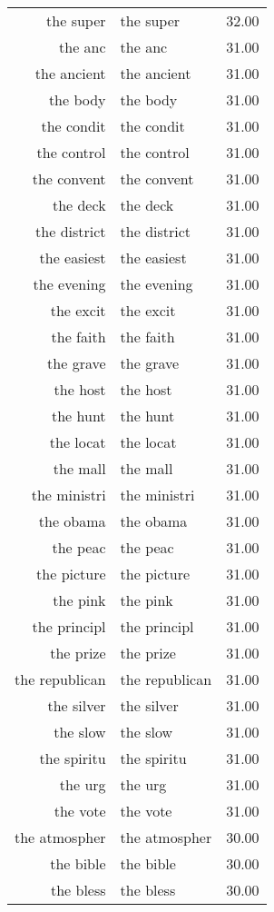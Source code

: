 \begin{table}[ht]
\begin{tabular}{rlr}
  the super & the super & 32.00 \\ 
  the anc & the anc & 31.00 \\ 
  the ancient & the ancient & 31.00 \\ 
  the body & the body & 31.00 \\ 
  the condit & the condit & 31.00 \\ 
  the control & the control & 31.00 \\ 
  the convent & the convent & 31.00 \\ 
  the deck & the deck & 31.00 \\ 
  the district & the district & 31.00 \\ 
  the easiest & the easiest & 31.00 \\ 
  the evening & the evening & 31.00 \\ 
  the excit & the excit & 31.00 \\ 
  the faith & the faith & 31.00 \\ 
  the grave & the grave & 31.00 \\ 
  the host & the host & 31.00 \\ 
  the hunt & the hunt & 31.00 \\ 
  the locat & the locat & 31.00 \\ 
  the mall & the mall & 31.00 \\ 
  the ministri & the ministri & 31.00 \\ 
  the obama & the obama & 31.00 \\ 
  the peac & the peac & 31.00 \\ 
  the picture & the picture & 31.00 \\ 
  the pink & the pink & 31.00 \\ 
  the principl & the principl & 31.00 \\ 
  the prize & the prize & 31.00 \\ 
  the republican & the republican & 31.00 \\ 
  the silver & the silver & 31.00 \\ 
  the slow & the slow & 31.00 \\ 
  the spiritu & the spiritu & 31.00 \\ 
  the urg & the urg & 31.00 \\ 
  the vote & the vote & 31.00 \\ 
  the atmospher & the atmospher & 30.00 \\ 
  the bible & the bible & 30.00 \\ 
  the bless & the bless & 30.00 \\ 

\end{tabular}
\end{table}
